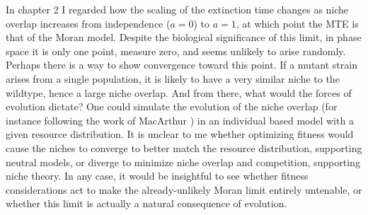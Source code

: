 In chapter 2 I regarded how the scaling of the extinction time changes as niche overlap increases from independence ($a=0$) to $a=1$, at which point the MTE is that of the Moran model. 
Despite the biological significance of this limit, in phase space it is only one point, measure zero, and seems unlikely to arise randomly. 
Perhaps there is a way to show convergence toward this point. %
If a mutant strain arises from a single population, it is likely to have a very similar niche to the wildtype, hence a large niche overlap. 
And from there, what would the forces of evolution dictate? 
One could simulate the evolution of the niche overlap (for instance following the work of MacArthur \cite{MacArthur1957}) in an individual based model with a given resource distribution. 
It is unclear to me whether optimizing fitness would cause the niches to converge to better match the resource distribution, supporting neutral models, or diverge to minimize niche overlap and competition, supporting niche theory. 
In any case, it would be insightful to see whether fitness considerations act to make the already-unlikely Moran limit entirely untenable, or whether this limit is actually a natural consequence of evolution. 

